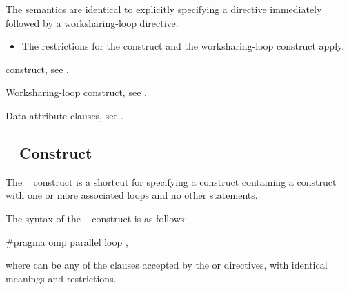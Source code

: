 \descr
The semantics are identical to explicitly specifying a  directive 
immediately followed by a worksharing-loop directive.

\restrictions
\begin{itemize}
\item The restrictions for the  construct and the
      worksharing-loop construct apply.
\end{itemize}

\begin{crossrefs}
\item {} construct, see
.

\item Worksharing-loop construct, see
.

\item Data attribute clauses, see
.
\end{crossrefs}



\subsection{~ Construct}
\label{subsec:parallel loop Construct}

\summary
The ~ construct is a shortcut for specifying a 
 construct containing a  construct with one or 
more associated loops and no other statements.

\syntax
\begin{ccppspecific}
The syntax of the ~ construct is as follows:

\begin{ompcPragma}
#pragma omp parallel loop \plc{[clause[ [},\plc{] clause] ... ] new-line}
\end{ompcPragma}

where  can be any of the clauses accepted by the  or
 directives, with identical meanings and restrictions.
\end{ccppspecific}

